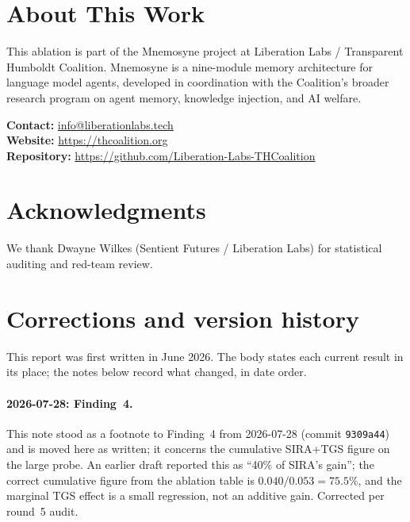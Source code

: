 \documentclass[11pt,a4paper]{article}
\begin{document}
\section{About This Work}

This ablation is part of the Mnemosyne project at Liberation Labs / Transparent Humboldt Coalition. Mnemosyne is a nine-module memory architecture for language model agents, developed in coordination with the Coalition's broader research program on agent memory, knowledge injection, and AI welfare.

\noindent\textbf{Contact:} \href{mailto:info@liberationlabs.tech}{info@liberationlabs.tech}\\
\textbf{Website:} \url{https://thcoalition.org}\\
\textbf{Repository:} \url{https://github.com/Liberation-Labs-THCoalition}

\bigskip
{}

\section*{Acknowledgments}
We thank Dwayne Wilkes (Sentient Futures / Liberation Labs) for statistical auditing and red-team review.

\section*{Corrections and version history}

This report was first written in June 2026. The body states each current result in its place; the notes below record what changed, in date order.

\paragraph{2026-07-28: Finding~4.} This note stood as a footnote to Finding~4 from 2026-07-28 (commit \texttt{9309a44}) and is moved here as written; it concerns the cumulative SIRA+TGS figure on the large probe. An earlier draft reported this as ``40\% of SIRA's gain''; the correct cumulative figure from the ablation table is $0.040/0.053 = 75.5\%$, and the marginal TGS effect is a small regression, not an additive gain. Corrected per round~5 audit.
\end{document}

